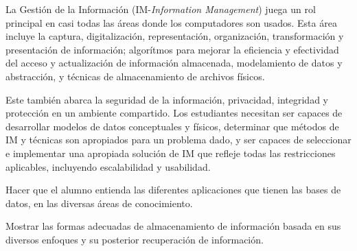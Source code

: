 \begin{syllabus}


\begin{justification}
La Gestión de la Información (IM-\textit{Information Management}) juega un rol principal en casi todas las áreas donde los computadores son usados. Esta área incluye la captura, digitalización, representación, organización, transformación y presentación de información; algorítmos para mejorar la eficiencia y efectividad del acceso y actualización de información almacenada, modelamiento de datos y abstracción, y técnicas de almacenamiento de archivos físicos.

Este también abarca la seguridad de la información, privacidad, integridad y protección en un ambiente compartido. Los estudiantes necesitan ser capaces de desarrollar modelos de datos conceptuales y físicos, determinar que métodos de IM y técnicas son apropiados para un problema dado, y ser capaces de seleccionar e implementar una apropiada solución de IM que refleje todas las restricciones aplicables, incluyendo escalabilidad y usabilidad.
\end{justification}

\begin{goals}
\item Hacer que el alumno entienda las diferentes aplicaciones que tienen las bases de datos, en las diversas áreas de conocimiento.
\item Mostrar las formas adecuadas de almacenamiento de información basada en sus diversos enfoques y su posterior recuperación de información.
\end{goals}




\end{syllabus}
